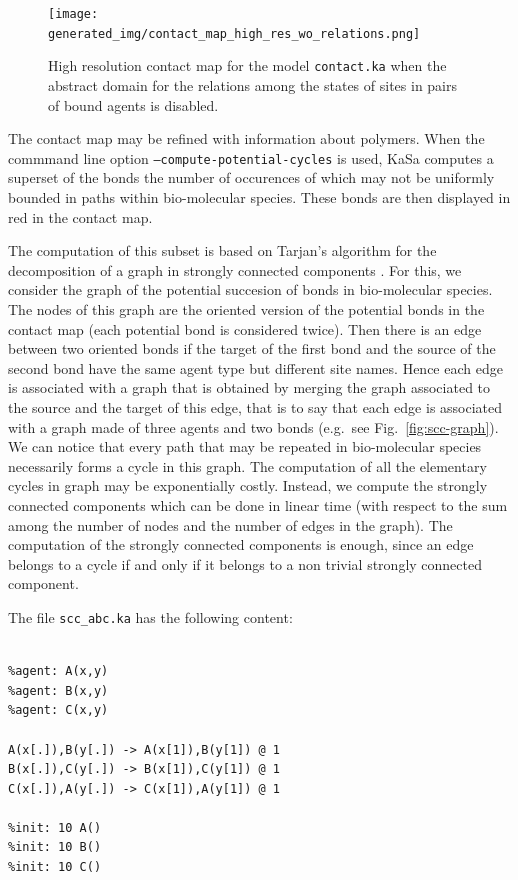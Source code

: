 \documentclass[11pt]{book}
\def\KaSa{\textsf{KaSa}}
\begin{document}
\begin{figure}[htbp]
\centering
\texttt{[image: generated\_img/contact\_map\_high\_res\_wo\_relations.png]}
\caption{High resolution contact map for the model \texttt{contact.ka} when the abstract domain for the relations among the states of sites in pairs of bound agents is disabled.}
\label{fig:cm-high-res-wo-rel}
\end{figure}

The contact map may be refined with information about polymers.
When the commmand line option \texttt{--compute-potential-cycles} is used, {\KaSa} computes a superset of the bonds the number of occurences of which may not be uniformly bounded in paths within bio-molecular species. These bonds are then displayed in red in the contact map.

The computation of this subset is based on Tarjan's algorithm for the decomposition of a graph in strongly connected components \cite{Tarjan}. For this, we consider the graph of the potential succesion of bonds in bio-molecular species. The nodes of this graph are the oriented version of the potential bonds in the contact map (each potential bond is considered twice). Then there is an edge between two oriented bonds if the target of the first bond and the source of the second bond have the same agent type but different site names. Hence each edge is associated with a graph that is obtained by merging the graph associated to the source and the target of this edge, that is to say that each edge is associated with a graph made of three agents and two bonds (e.g.~see Fig.~\ref{fig:scc-graph}). We can notice that every path that may be repeated in bio-molecular species necessarily forms a cycle in this graph. The computation of all the elementary cycles in graph may be exponentially costly. Instead, we compute the strongly connected components which can be done in linear time (with respect to the sum among the number of nodes and the number of edges in the graph). The computation of the strongly connected components is enough, since an edge belongs to a cycle if and only if it belongs to a non trivial strongly connected component.

The file \texttt{scc\_abc.ka}
has the following content:
\begin{lstlisting}[language=kappa]

%agent: A(x,y)
%agent: B(x,y)
%agent: C(x,y)

A(x[.]),B(y[.]) -> A(x[1]),B(y[1]) @ 1
B(x[.]),C(y[.]) -> B(x[1]),C(y[1]) @ 1
C(x[.]),A(y[.]) -> C(x[1]),A(y[1]) @ 1

%init: 10 A()
%init: 10 B()
%init: 10 C()
\end{lstlisting}
\end{document}
